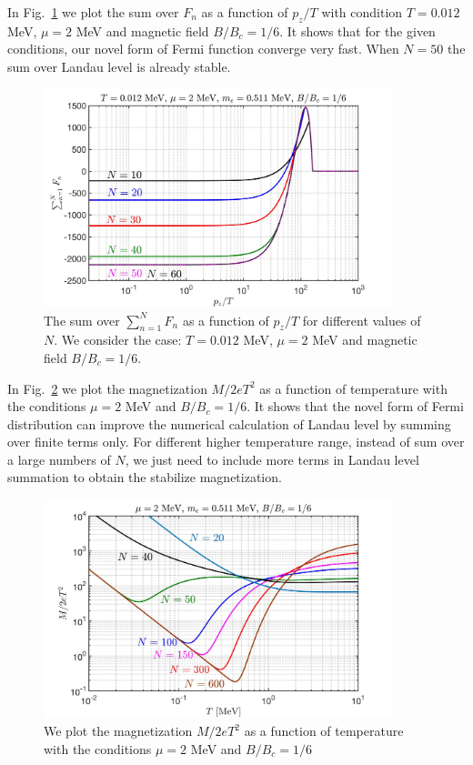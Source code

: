 \documentclass[sn-mathphys,Numbered]{sn-jnl}
\theoremstyle{thmstyleone}%
\theoremstyle{thmstyletwo}%
\theoremstyle{thmstylethree}%
\begin{document}
In Fig.~\ref{Fn_Checking} we plot the sum over $F_n$ as a function of $p_z/T$ with condition $T=0.012$ MeV, $\mu=2$ MeV and magnetic field $B/B_c=1/6$. It shows that for the given conditions, our novel form of Fermi function converge very fast. When $N=50$ the sum over Landau level is already stable.
\begin{figure}[h]
\begin{center}
\includegraphics[width=0.9\textwidth]{./plot/NewFermi_SumChecking}
\caption{The sum over  $\sum_{n=1}^NF_n$ as a function of $p_z/T$ for different values of $N$. We consider the case: $T=0.012$ MeV, $\mu=2$ MeV and magnetic field $B/B_c=1/6$.}
\label{Fn_Checking}
\end{center}
\end{figure}
In Fig.~\ref{M_Checking} we plot the magnetization $M/2eT^2$ as a function of temperature with the conditions $\mu=2$ MeV and $B/B_c=1/6$. It shows that the novel form of Fermi distribution can improve the numerical calculation of Landau level by summing over finite terms only. For different higher temperature range, instead of sum over a large numbers of $N$, we just need to include more terms in Landau level summation to obtain the stabilize magnetization.
\begin{figure}[h]
\begin{center}
\includegraphics[width=0.9\textwidth]{./plot/NewFermi_Magnetization_tot003}
\caption{We plot the magnetization $M/2eT^2$ as a function of temperature with the conditions $\mu=2$ MeV and $B/B_c=1/6$}
\label{M_Checking}
\end{center}
\end{figure}
\end{document}
